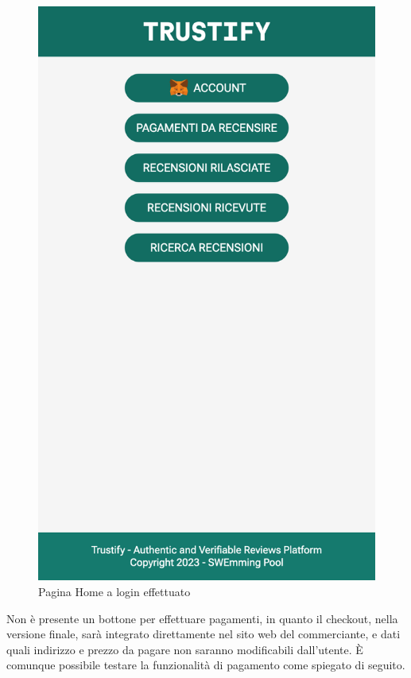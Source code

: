 \begin{figure}[H]
      \includegraphics[width=\linewidth]{src/img/home_login.png}
      \caption{Pagina Home a login effettuato}\label{fig:home_login}
    \endminipage\hfill
\end{figure}

Non è presente un bottone per effettuare pagamenti, in quanto il checkout, nella versione finale, sarà integrato direttamente nel sito web del commerciante, e dati quali indirizzo e prezzo da pagare non saranno modificabili dall'utente. È comunque possibile testare la funzionalità di pagamento come spiegato di seguito.


